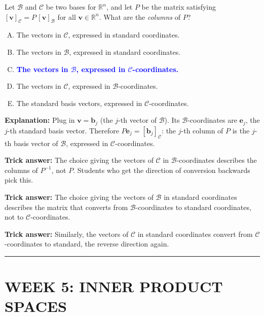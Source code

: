 \documentclass[12pt]{amsart}
\newcommand{\divider}{
  \vspace{-1em}
  \noindent
  \raisebox{-0.15ex}{\textbullet}%
  \hspace{0.5em}%
  \rule[0.5ex]{0.95\textwidth}{1.0pt}%
  \hspace{0.5em}%
  \raisebox{-0.15ex}{\textbullet}%
  \vspace{0em}
}
\begin{document}
Let $\mathcal{B}$ and $\mathcal{C}$ be two bases for $\mathbb{R}^n$, and let $P$ be the matrix
satisfying $[\mathbf{v}]_\mathcal{C} = P\,[\mathbf{v}]_\mathcal{B}$ for all $\mathbf{v} \in \mathbb{R}^n$.
What are the \emph{columns} of $P$?

\begin{enumerate}[(A)]
\item The vectors in $\mathcal{C}$, expressed in standard coordinates.
\item The vectors in $\mathcal{B}$, expressed in standard coordinates.
\item \textcolor{blue}{\textbf{The vectors in $\mathcal{B}$, expressed in $\mathcal{C}$-coordinates.}}
\item The vectors in $\mathcal{C}$, expressed in $\mathcal{B}$-coordinates.
\item The standard basis vectors, expressed in $\mathcal{C}$-coordinates.
\end{enumerate}

\textbf{Explanation:}
Plug in $\mathbf{v} = \mathbf{b}_j$ (the $j$-th vector of $\mathcal{B}$).
Its $\mathcal{B}$-coordinates are $\mathbf{e}_j$, the $j$-th standard basis vector.
Therefore $P\mathbf{e}_j = [\mathbf{b}_j]_\mathcal{C}$: the $j$-th column of $P$ is the
$j$-th basis vector of $\mathcal{B}$, expressed in $\mathcal{C}$-coordinates.

\textbf{Trick answer:}
The choice giving the vectors of $\mathcal{C}$ in $\mathcal{B}$-coordinates describes
the columns of $P^{-1}$, not $P$.
Students who get the direction of conversion backwards pick this.

\textbf{Trick answer:}
The choice giving the vectors of $\mathcal{B}$ in standard coordinates describes the
matrix that converts from $\mathcal{B}$-coordinates to standard coordinates, not to
$\mathcal{C}$-coordinates.

\textbf{Trick answer:}
Similarly, the vectors of $\mathcal{C}$ in standard coordinates convert from
$\mathcal{C}$-coordinates to standard, the reverse direction again.

\divider

\section*{WEEK 5: INNER PRODUCT SPACES}

\end{document}
